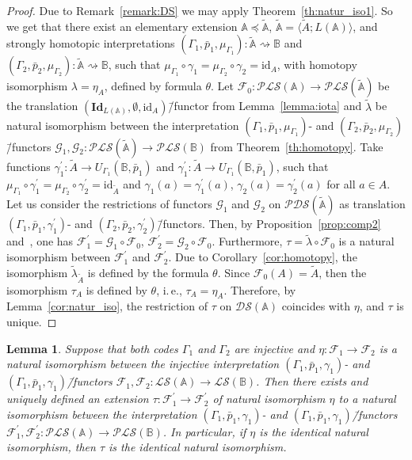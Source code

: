\documentclass[12pt]{article}
\newtheorem{lemma}{Lemma}
\theoremstyle{definition}
\def\MA{{\mathbb{A}}}
\def\MB{{\mathbb{B}}}
\newcommand{\nsA}{\widetilde{\mathbb A}}
\newcommand{\nsuA}{\widetilde{A}}
\def\F{{\mathcal{F}}}
\def\G{{\mathcal{G}}}
\def\PLS{{\mathcal{PLS}}}
\def\PDS{{\mathcal{PDS}}}
\def\DS{{\mathcal{DS}}}
\def\LS{{\mathcal{LS}}}
\def\id{{\mathrm{id}}}
\def\Id{{\mathbf{Id}}}
\begin{document}
\begin{proof}
Due to Remark~\ref{remark:DS} we may apply Theorem~\ref{th:natur_iso1}. So we get that there exist an elementary extension $\MA\preceq \nsA$, $\nsA=\langle \nsuA; L(\MA)\rangle$, and strongly homotopic interpretations $(\Gamma_1,\bar p_1,\mu_{\Gamma_1})\colon \nsA \rightsquigarrow \MB$ and $(\Gamma_2,\bar p_2,\mu_{\Gamma_2})\colon \nsA \rightsquigarrow \MB$, such that $\mu_{\Gamma_1} \circ\gamma_1=\mu_{\Gamma_2} \circ\gamma_2=\id_A$, with homotopy isomorphism $\lambda=\eta_A$, defined by formula $\theta$. Let $\F_0\colon \PLS(\MA)\to \PLS(\nsA)$ be the translation $(\Id_{L(\MA)},\emptyset,\id_A)$\=/functor from Lemma~\ref{lemma:iota} and $\tilde\lambda$ be natural isomorphism between the interpretation $(\Gamma_1,\bar p_1,\mu_{\Gamma_1})$- and $(\Gamma_2,\bar p_2,\mu_{\Gamma_2})$\=/functors $\G_1,\G_2\colon \PLS(\nsA)\to \PLS(\MB)$ from Theorem~\ref{th:homotopy}. Take  functions $\gamma^\prime_1\colon \nsuA\to U_{\Gamma_1}(\MB,\bar p_1)$ and $\gamma^\prime_1\colon \nsuA\to U_{\Gamma_1}(\MB,\bar p_1)$, such that $\mu_{\Gamma_1}\circ\gamma_1^\prime=\mu_{\Gamma_2}\circ\gamma_2^\prime=\id_{\nsuA}$ and $\gamma_1(a)=\gamma_1^\prime(a)$, $\gamma_2(a)=\gamma_2^\prime(a)$ for all $a\in A$. Let us consider the restrictions of functors $\G_1$ and $\G_2$ on $\PDS(\nsA)$ as translation $(\Gamma_1,\bar p_1,\gamma^\prime_1)$- and $(\Gamma_2,\bar p_2,\gamma^\prime_2)$\=/functors. Then, by Proposition~\ref{prop:comp2} and~\cite[Lemma~9]{Th_int1}, one has $\F^\prime_1=\G_1\circ\F_0$, $\F^\prime_2=\G_2\circ\F_0$. Furthermore, $\tau=\tilde\lambda\circ\F_0$ is a natural isomorphism between $\F^\prime_1$ and $\F^\prime_2$. Due to Corollary~\ref{cor:homotopy}, the isomorphism $\tilde\lambda_{\nsuA}$ is defined by the formula $\theta$. Since $\F_0(A)=\nsuA$, then the isomorphism $\tau_A$ is defined by $\theta$, i.\,e., $\tau_A=\eta_A$. Therefore, by Lemma~\ref{cor:natur_iso}, the restriction of $\tau$ on $\DS(\MA)$ coincides with $\eta$, and $\tau$ is unique. 
\end{proof}

\begin{lemma}\label{cor:natur_iso2}
Suppose that both codes $\Gamma_1$ and $\Gamma_2$ are injective and $\eta\colon \F_1\to\F_2$ is a natural isomorphism between the injective interpretation $(\Gamma_1,\bar p_1,\gamma_1)$- and $(\Gamma_1,\bar p_1,\gamma_1)$\=/functors $\F_1,\F_2\colon\LS(\MA)\to\LS(\MB)$. Then there exists and uniquely defined an extension $\tau\colon \F_1^\prime\to \F_2^\prime$ of natural isomorphism $\eta$ to a natural isomorphism between the interpretation $(\Gamma_1,\bar p_1,\gamma_1)$- and $(\Gamma_1,\bar p_1,\gamma_1)$\=/functors $\F_1^\prime,\F_2^\prime\colon\PLS(\MA)\to\PLS(\MB)$. In particular, if $\eta$ is the identical natural isomorphism, then $\tau$ is the identical natural isomorphism.
\end{lemma}
\end{document}
